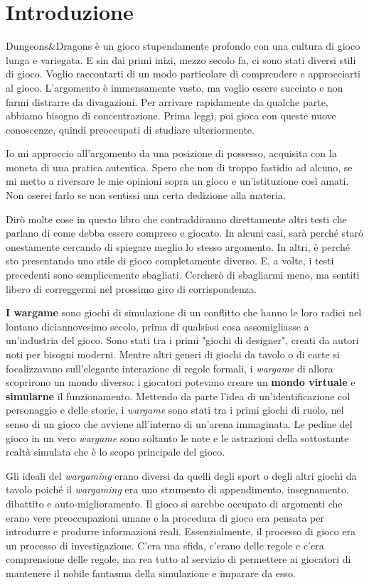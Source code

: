 \chapter{Introduzione}

Dungeons\&Dragons è un gioco stupendamente profondo con una cultura di gioco lunga e variegata. E sin dai primi inizi, mezzo secolo fa, ci sono stati diversi stili di gioco. Voglio raccontarti di un modo particolare di comprendere e approcciarti al gioco. L'argomento è immensamente vasto, ma voglio essere succinto e non farmi distrarre da divagazioni. Per arrivare rapidamente da qualche parte, abbiamo bisogno di concentrazione. Prima leggi, poi gioca con queste nuove conoscenze, quindi preoccupati di studiare ulteriormente.

Io mi approccio all'argomento da una posizione di possesso, acquisita con la moneta di una pratica autentica. Spero che non di troppo fastidio ad alcuno, se mi metto a riversare le mie opinioni sopra un gioco e un'istituzione così amati. Non oserei farlo se non sentissi una certa dedizione alla materia.

Dirò molte cose in questo libro che contraddiranno direttamente altri testi che parlano di come \dnd debba essere compreso e giocato. In alcuni casi, sarà perché starò onestamente cercando di spiegare meglio lo stesso argomento. In altri, è perché sto presentando uno stile di gioco completamente diverso. E, a volte, i testi precedenti sono semplicemente sbagliati. Cercherò di sbagliarmi meno, ma sentiti libero di correggermi nel prossimo giro di corrispondenza.

\textbf{I wargame} sono giochi di simulazione di un conflitto che hanno le loro radici nel lontano diciannovesimo secolo, prima di qualsiasi cosa assomigliasse a un'industria del gioco. Sono stati tra i primi "giochi di designer", creati da autori noti per bisogni moderni. Mentre altri generi di giochi da tavolo o di carte si focalizzavano sull'elegante interazione di regole formali, i \textit{wargame} di allora scoprirono un mondo diverso: i giocatori potevano creare un \textbf{mondo virtuale} e \textbf{simularne} il funzionamento. Mettendo da parte l'idea di un'identificazione col personaggio e delle storie, i \textit{wargame} sono stati tra i primi giochi di ruolo, nel senso di un gioco che avviene all'interno di un'arena immaginata. Le pedine del gioco in un vero \textit{wargame} sono soltanto le note e le astrazioni della sottostante realtà simulata che è lo scopo principale del gioco.

Gli ideali del \textit{wargaming} erano diversi da quelli degli sport o degli altri giochi da tavolo poiché il \textit{wargaming} era uno strumento di appendimento, insegnamento, dibattito e auto-miglioramento. Il gioco si sarebbe occupato di argomenti che erano vere preoccupazioni umane e la procedura di gioco era pensata per introdurre e produrre informazioni reali. Essenzialmente, il processo di gioco era un processo di investigazione. C'era una sfida, c'erano delle regole e c'era comprensione delle regole, ma rea tutto al servizio di permettere ai giocatori di mantenere il nobile fantasma della simulazione e imparare da esso.

